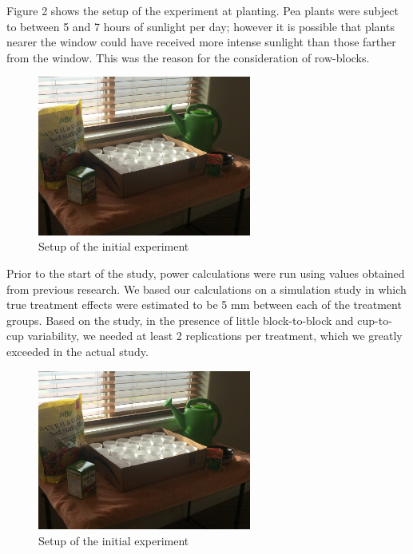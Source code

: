 \documentclass[1p,12pt]{elsarticle}\usepackage[]{graphicx}\usepackage[]{color}
\begin{document}
Figure 2 shows the setup of the experiment at planting. Pea plants were subject to between 5 and 7 hours of sunlight per day; however it is possible that plants nearer the window could have received more intense sunlight than those farther from the window. This was the reason for the consideration of row-blocks. 

 \begin{figure}[h!]
 	\caption{Setup of the initial experiment}
 	\centering
	\includegraphics[width = 7cm]{figure/setup.JPG}
\end{figure}

Prior to the start of the study, power calculations were run using values obtained from previous research.  We based our calculations on a simulation study in which true treatment effects were estimated to be 5 mm between each of the treatment groups. Based on the study, in the presence of little block-to-block and cup-to-cup variability, we needed at least 2 replications per treatment, which we greatly exceeded in the actual study. 

 \begin{figure}[h!]
 	\caption{Setup of the initial experiment}
 	\centering
	\includegraphics[width = 7cm]{figure/setup.JPG}
\end{figure}
\end{document}
